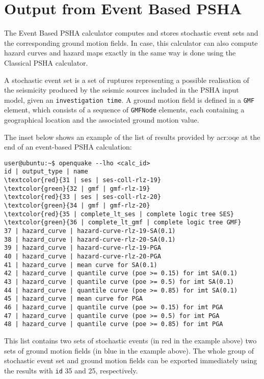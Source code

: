 \section{Output from Event Based PSHA}\label{EventBasedOutput}
%
The Event Based PSHA calculator computes and stores stochastic 
event sets and the corresponding ground motion fields. In case,
this calculator can also compute hazard curves and hazard maps
exactly in the same way is done using the Classical PSHA calculator.

A stochastic event set is a set of ruptures representing a possible
realisation of the seismicity produced by the seismic sources 
included in the PSHA input model, given an \texttt{investigation time}.
%
A ground motion field is defined in a \Verb+GMF+ element, which 
consists of a sequence of \Verb+GMFNode+ elements, 
each containing a geographical location and the associated ground 
motion value.

The inset below shows an example of the list of results provided by 
\gls{acr:oqe} at the end of an event-based PSHA calculation:
\begin{Verbatim}[frame=single, commandchars=\\\{\}]
user@ubuntu:~$ openquake --lho <calc_id> 
id | output_type | name
\textcolor{red}{31 | ses | ses-coll-rlz-19}
\textcolor{green}{32 | gmf | gmf-rlz-19}
\textcolor{red}{33 | ses | ses-coll-rlz-20}
\textcolor{green}{34 | gmf | gmf-rlz-20}
\textcolor{red}{35 | complete_lt_ses | complete logic tree SES}
\textcolor{green}{36 | complete_lt_gmf | complete logic tree GMF}
37 | hazard_curve | hazard-curve-rlz-19-SA(0.1)
38 | hazard_curve | hazard-curve-rlz-20-SA(0.1)
39 | hazard_curve | hazard-curve-rlz-19-PGA
40 | hazard_curve | hazard-curve-rlz-20-PGA
41 | hazard_curve | mean curve for SA(0.1)
42 | hazard_curve | quantile curve (poe >= 0.15) for imt SA(0.1)
43 | hazard_curve | quantile curve (poe >= 0.5) for imt SA(0.1)
44 | hazard_curve | quantile curve (poe >= 0.85) for imt SA(0.1)
45 | hazard_curve | mean curve for PGA
46 | hazard_curve | quantile curve (poe >= 0.15) for imt PGA
47 | hazard_curve | quantile curve (poe >= 0.5) for imt PGA
48 | hazard_curve | quantile curve (poe >= 0.85) for imt PGA
\end{Verbatim}
This list contains two sets of stochastic events (in red in the example 
above) two sets of ground motion fields (in blue in the example above).
The whole group of stochastic event set and ground motion fields can 
be exported immediately using the results with \texttt{id} 35 and 25,
respectively.
